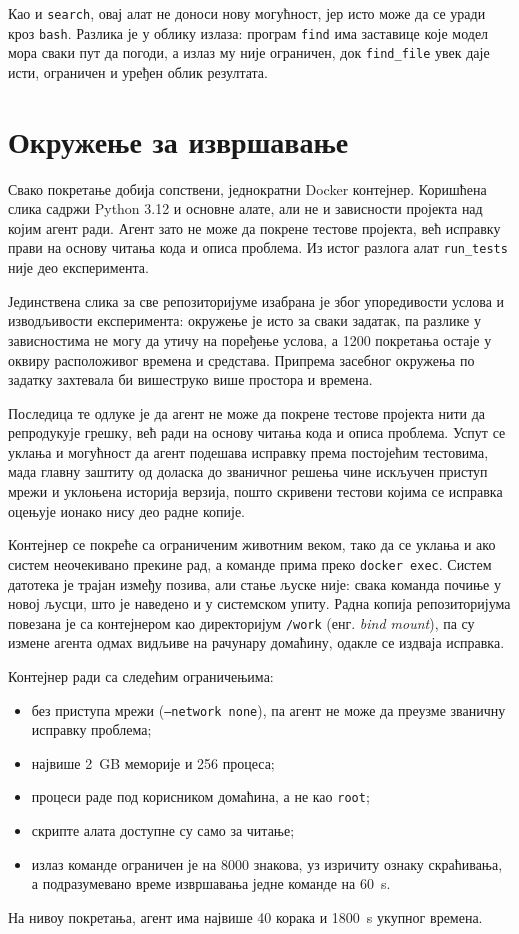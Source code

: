 \documentclass[12pt,a4paper]{report}
\begin{document}
	Као и \texttt{search}, овај алат не доноси нову могућност, јер исто може да
	се уради кроз \texttt{bash}. Разлика је у облику излаза: програм
	\texttt{find} има заставице које модел мора сваки пут да погоди, а излаз му
	није ограничен, док \texttt{find\_file} увек даје исти, ограничен и уређен
	облик резултата.

	\section{Окружење за извршавање}

	Свако покретање добија сопствени, једнократни Docker контејнер.
	Коришћена слика садржи Python 3.12 и основне алате, али не и зависности
	пројекта над којим агент ради. Агент зато не може да покрене тестове
	пројекта, већ исправку прави на основу читања кода и описа проблема. Из
	истог разлога алат \texttt{run\_tests} није део експеримента.
	
	Јединствена слика за све репозиторијуме изабрана је због упоредивости
	услова и изводљивости експеримента: окружење је исто за сваки задатак, па
	разлике у зависностима не могу да утичу на поређење услова, а 1200
	покретања остаје у оквиру расположивог времена и средстава. Припрема
	засебног окружења по задатку захтевала би вишеструко више простора и
	времена.
	
	Последица те одлуке је да агент не може да покрене тестове пројекта нити да
	репродукује грешку, већ ради на основу читања кода и описа проблема. Успут
	се уклања и могућност да агент подешава исправку према постојећим
	тестовима, мада главну заштиту од доласка до званичног решења чине
	искључен приступ мрежи и уклоњена историја верзија, пошто скривени тестови
	којима се исправка оцењује ионако нису део радне копије.

	Контејнер се покреће са ограниченим животним веком, тако да се уклања и ако
	систем неочекивано прекине рад, а команде прима преко \texttt{docker exec}.
	Систем датотека је трајан између позива, али стање љуске није: свака
	команда почиње у новој љусци, што је наведено и у системском упиту.
	Радна копија репозиторијума повезана је са контејнером као директоријум
	\texttt{/work} (енг. \textit{bind mount}), па су измене агента одмах видљиве
	на рачунару домаћину, одакле се издваја исправка.

	Контејнер ради са следећим ограничењима:
	\begin{itemize}
		\item без приступа мрежи (\texttt{--network none}), па агент не може да
		преузме званичну исправку проблема;
		\item највише 2~GB меморије и 256 процеса;
		\item процеси раде под корисником домаћина, а не као \texttt{root};
		\item скрипте алата доступне су само за читање;
		\item излаз команде ограничен је на 8000 знакова, уз изричиту ознаку
		скраћивања, а подразумевано време извршавања једне команде на 60~s.
	\end{itemize}
	На нивоу покретања, агент има највише 40 корака и 1800~s укупног времена.
\end{document}
